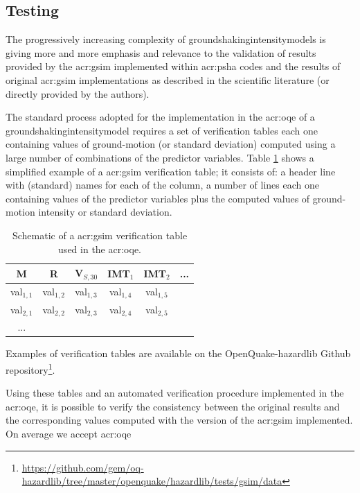 \subsection{Testing}
%
The progressively increasing complexity of 
\glspl{groundshakingintensitymodel}
is giving more and more emphasis and relevance to the validation 
of results provided by the \gls{acr:gsim} implemented within 
\gls{acr:psha} codes and the results of original \gls{acr:gsim} 
implementations as described in the scientific literature 
(or directly provided by the authors).

The standard process adopted for the implementation in the 
\gls{acr:oqe} of a \gls{groundshakingintensitymodel} requires a 
set of verification tables each one containing values of 
ground-motion (or standard deviation) computed using a large 
number of combinations of the predictor variables. 
%
Table \ref{tab:verification} shows a simplified example of a 
\gls{acr:gsim} verification table; it consists of: a header 
line with (standard) names for each of the column, a number
of lines each one containing values of the predictor variables
plus the computed values of ground-motion intensity or standard
deviation.
\begin{table}[!ht]
\centering
\begin{tabular}{|cccccc|}
\hline
\rowcolor{anti-flashwhite}
M & R & V$_{S,30}$ & IMT$_1$ & IMT$_2$ & ... \\
\hline 
val$_{1,1}$ & val$_{1,2}$ & val$_{1,3}$ & val$_{1,4}$ & val$_{1,5}$ & \\
val$_{2,1}$ & val$_{2,2}$ & val$_{2,3}$ & val$_{2,4}$ & val$_{2,5}$ & \\
... & & & & & \\
\hline
\end{tabular}
\caption{Schematic of a \gls{acr:gsim} verification table used in the 
\gls{acr:oqe}.}
\label{tab:verification}
\end{table}
Examples of verification tables are available on the OpenQuake-hazardlib Github
repository\footnote{
\href{https://github.com/gem/oq-hazardlib/tree/master/openquake/hazardlib/tests/gsim/data}{
https://github.com/gem/oq-hazardlib/tree/master/openquake/hazardlib/tests/gsim/data}
}.

Using these tables and an automated verification procedure implemented
in the \gls{acr:oqe}, it is possible to verify the consistency between 
the original results and the corresponding values computed with the 
version of the \gls{acr:gsim} implemented. 
%
On average we accept \gls{acr:oqe}

